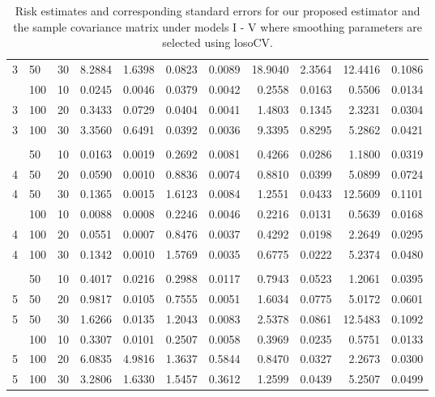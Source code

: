 \documentclass[12pt]{article}
\theoremstyle{definition}
\begin{document}
\begin{table}[H]
\begin{tabular}{lllrrrrrrrr}
  3 & 50 & 30 & 8.2884 & 1.6398 & 0.0823 & 0.0089 & 18.9040 & 2.3564 & 12.4416 & 0.1086 \\ 
      \hdashline
  3 & 100 & 10 & 0.0245 & 0.0046 & 0.0379 & 0.0042 & 0.2558 & 0.0163 & 0.5506 & 0.0134 \\ 
  3 & 100 & 20 & 0.3433 & 0.0729 & 0.0404 & 0.0041 & 1.4803 & 0.1345 & 2.3231 & 0.0304 \\ 
  3 & 100 & 30 & 3.3560 & 0.6491 & 0.0392 & 0.0036 & 9.3395 & 0.8295 & 5.2862 & 0.0421 \\ 
         \hdashline \\
      \hdashline
  4 & 50 & 10 & 0.0163 & 0.0019 & 0.2692 & 0.0081 & 0.4266 & 0.0286 & 1.1800 & 0.0319 \\ 
  4 & 50 & 20 & 0.0590 & 0.0010 & 0.8836 & 0.0074 & 0.8810 & 0.0399 & 5.0899 & 0.0724 \\ 
  4 & 50 & 30 & 0.1365 & 0.0015 & 1.6123 & 0.0084 & 1.2551 & 0.0433 & 12.5609 & 0.1101 \\ 
      \hdashline
  4 & 100 & 10 & 0.0088 & 0.0008 & 0.2246 & 0.0046 & 0.2216 & 0.0131 & 0.5639 & 0.0168 \\ 
  4 & 100 & 20 & 0.0551 & 0.0007 & 0.8476 & 0.0037 & 0.4292 & 0.0198 & 2.2649 & 0.0295 \\ 
  4 & 100 & 30 & 0.1342 & 0.0010 & 1.5769 & 0.0035 & 0.6775 & 0.0222 & 5.2374 & 0.0480 \\ 
        \hdashline \\
      \hdashline
 5 & 50 & 10 & 0.4017 & 0.0216 & 0.2988 & 0.0117 & 0.7943 & 0.0523 & 1.2061 & 0.0395 \\ 
  5 & 50 & 20 & 0.9817 & 0.0105 & 0.7555 & 0.0051 & 1.6034 & 0.0775 & 5.0172 & 0.0601 \\ 
  5 & 50 & 30 & 1.6266 & 0.0135 & 1.2043 & 0.0083 & 2.5378 & 0.0861 & 12.5483 & 0.1092 \\ 
      \hdashline
  5 & 100 & 10 & 0.3307 & 0.0101 & 0.2507 & 0.0058 & 0.3969 & 0.0235 & 0.5751 & 0.0133 \\ 
  5 & 100 & 20 & 6.0835 & 4.9816 & 1.3637 & 0.5844 & 0.8470 & 0.0327 & 2.2673 & 0.0300 \\ 
  5 & 100 & 30 & 3.2806 & 1.6330 & 1.5457 & 0.3612 & 1.2599 & 0.0439 & 5.2507 & 0.0499 \\ 
   \hline
\end{tabular}
\caption{Risk estimates and corresponding standard errors for our proposed estimator and the sample covariance matrix under models I - V where smoothing parameters are selected using losoCV.} 
\end{table}
\end{document}
